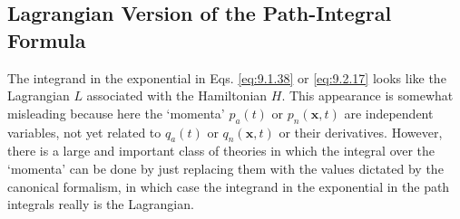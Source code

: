 
\subsection{Lagrangian Version of the Path-Integral Formula}

The integrand in the exponential in Eqs. \eqref{eq:9.1.38} or \eqref{eq:9.2.17} looks like
the Lagrangian $L$ associated with the Hamiltonian $H$. This appearance is
somewhat misleading because here the `momenta' $p_a(t)$ or $p_n(\mathbf{x},t)$
are independent variables, not yet related to $q_a(t)$ or $q_n(\mathbf{x},t)$
or their derivatives. However, there is a large and important class of
theories in which the integral over the `momenta' can be done by just replacing
them with the values dictated by the canonical formalism, in which case the
integrand in the exponential in the path integrals really is the Lagrangian.

